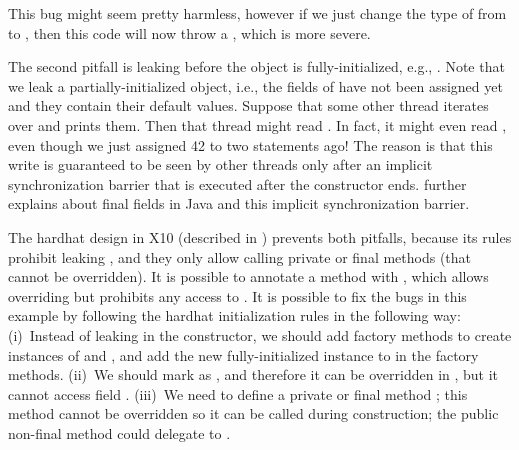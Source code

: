 This bug might seem pretty harmless,
    however if we just change the type of  from  to ,
    then this code will now throw a ,
    which is more severe.

The second pitfall is leaking \this before the object is fully-initialized,
    e.g., .
Note that we leak a partially-initialized object, i.e.,
    the fields of  have not been assigned yet and they contain their default values.
Suppose that some other thread iterates over  and prints them.
Then that thread might read .
In fact, it might even read , even though we just assigned 42 to  two statements ago!
The reason is that this write is guaranteed to be seen by other threads only
    after an implicit synchronization barrier that is executed after the constructor ends.
 further explains about final fields in Java and this implicit synchronization barrier.



The hardhat design in X10 (described in )
    prevents both pitfalls,
    because its rules prohibit leaking \this,
    and they only allow calling private or final methods (that cannot be overridden).
It is possible to annotate a method with ,
    which allows overriding but prohibits any access to \this.
It is possible to fix the bugs in this example by following the hardhat initialization rules
    in the following way:
    (i)~Instead of leaking \this in the constructor,
        we should add factory methods to create instances of  and ,
        and add the new fully-initialized instance to  in the factory methods.
    (ii)~We should mark  as ,
        and therefore it can be overridden in , but it cannot access field .
    (iii)~We need to define a private or final method ;
        this method cannot be overridden so it can be called during construction;
        the public non-final method  could delegate to .



